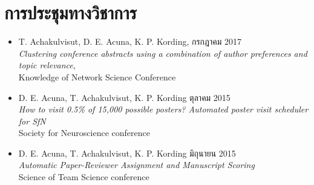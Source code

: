 \section{\sc การประชุมทางวิชาการ}

\begin{itemize}[leftmargin=0cm, label={}]

\item T. Achakulvisut, D. E. Acuna, K. P. Kording, \hfill กรกฎาคม 2017\\ {\em Clustering conference abstracts using a combination of author preferences and topic relevance}, \\Knowledge of Network Science Conference

\item D. E. Acuna, T. Achakulvisut, K. P. Kording \hfill ตุลาคม 2015\\
{\em How to visit 0.5\% of 15,000 possible posters? Automated poster visit scheduler for SfN}\\ Society for Neuroscience conference

\item D. E. Acuna, T. Achakulvisut, K. P. Kording \hfill มิถุนายน 2015\\
{\em Automatic Paper-Reviewer Assignment and Manuscript Scoring}\\
Science of Team Science conference

\end{itemize}